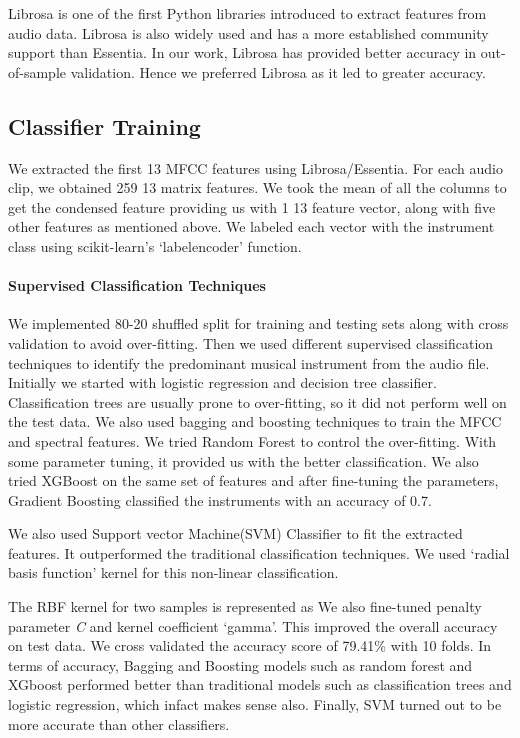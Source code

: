 \documentclass[conference]{IEEEtran}
\begin{document}
Librosa is one of the first Python libraries introduced to extract features from audio data. Librosa is also widely used and has a more established community support than Essentia. In our work, Librosa has provided better accuracy in out-of-sample validation. Hence we preferred Librosa as it led to greater accuracy.

\subsection{Classifier Training}

We extracted the first 13 MFCC features using Librosa/Essentia. For each audio clip, we obtained 259  13 matrix features. We took the mean of all the columns to get the condensed feature providing us with 1  13 feature vector, along with five other features as mentioned above. We labeled each vector with the instrument class using scikit-learn's `labelencoder' function.

\paragraph{Supervised Classification Techniques}

We implemented  80-20 shuffled split for training and testing sets along with cross validation to avoid over-fitting. Then we used different supervised classification techniques to identify the predominant musical instrument from the audio file. Initially we started with logistic regression and decision tree classifier. Classification trees are usually prone to over-fitting, so it did not perform well on the test data. We also used bagging and boosting techniques to train the MFCC and spectral features. We tried Random Forest to control the over-fitting. With some parameter tuning, it provided us with the better classification. We also tried XGBoost on the same set of features and after fine-tuning the parameters, Gradient Boosting classified the instruments with an accuracy of 0.7. 

We also used Support vector Machine(SVM) Classifier to fit the extracted features. It outperformed the traditional classification techniques. We used `radial basis function' kernel for this non-linear classification. 

The RBF kernel for two samples is represented as 
We also fine-tuned penalty parameter \textit{C} and kernel coefficient `gamma'. This improved the overall accuracy on test data. We cross validated the accuracy score of 79.41\% with 10 folds. In terms of accuracy, Bagging and Boosting models such as random forest and XGboost performed better than traditional models such as classification trees and logistic regression, which infact makes sense also. Finally, SVM turned out to be more accurate than other classifiers.
\end{document}

